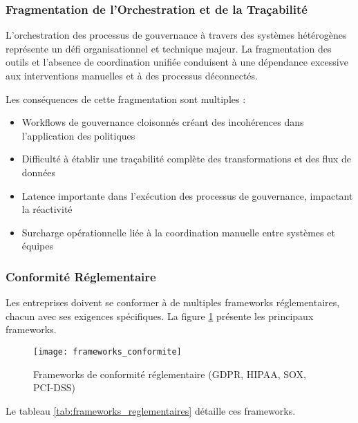 \subsubsection{Fragmentation de l'Orchestration et de la Traçabilité}

L'orchestration des processus de gouvernance à travers des systèmes hétérogènes représente un défi organisationnel et technique majeur. La fragmentation des outils et l'absence de coordination unifiée conduisent à une dépendance excessive aux interventions manuelles et à des processus déconnectés.

Les conséquences de cette fragmentation sont multiples :
\begin{itemize}
    \item Workflows de gouvernance cloisonnés créant des incohérences dans l'application des politiques
    \item Difficulté à établir une traçabilité complète des transformations et des flux de données
    \item Latence importante dans l'exécution des processus de gouvernance, impactant la réactivité
    \item Surcharge opérationnelle liée à la coordination manuelle entre systèmes et équipes
\end{itemize}

\subsubsection{Conformité Réglementaire}

Les entreprises doivent se conformer à de multiples frameworks réglementaires, chacun avec ses exigences spécifiques. La figure \ref{fig:frameworks_conformite} présente les principaux frameworks.

\begin{figure}[htpb]
\centering
\texttt{[image: frameworks\_conformite]}
\caption{Frameworks de conformité réglementaire (GDPR, HIPAA, SOX, PCI-DSS)}
\label{fig:frameworks_conformite}
\end{figure}

Le tableau \ref{tab:frameworks_reglementaires} détaille ces frameworks.


